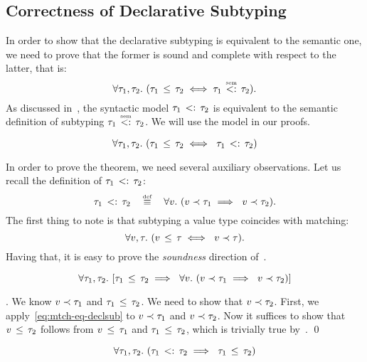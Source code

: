 \subsection{Correctness of Declarative Subtyping}\label{sec:declsub-correct}

In order to show that the declarative subtyping is equivalent
to the semantic one,
we need to prove that the former is sound and complete with respect
to the latter, that is:
\[
\forall \ty_1, \ty_2.\ (\bjsub{\ty_1}{\ty_2} \iff \bjtruesemsub{\ty_1}{\ty_2}).
\]
As discussed in~, 
the syntactic model $\tau_1 \, <: \, \tau_2$ is equivalent 
to the semantic definition of subtyping $\bjtruesemsub{\ty_1}{\ty_2}$.
We will use the model in our proofs.

\begin{theorem}\label{thm:declsub-correct}
\[
\forall \ty_1, \ty_2.\ (\bjsub{\ty_1}{\ty_2} \iff\ \bjsemsub{\ty_1}{\ty_2})
\]
\end{theorem}

In order to prove the theorem, we need several auxiliary observations.
Let us recall the definition of $\tau_1 \, <: \, \tau_2$:
\[
\bjsemsub{\ty_1}{\ty_2} \quad \defsign \quad
\forall \vty.\ (\bjmtch{\vty}{\ty_1} \implies\ \bjmtch{\vty}{\ty_2}).
\]
The first thing to note is that
subtyping a value type coincides with matching:
\begin{equation}\label{eq:mtch-eq-declsub}
\forall \vty, \ty.\ (\bjsub{\vty}{\ty} \iff\ \bjmtch{\vty}{\ty}).
\end{equation}
Having that, it is easy to prove the \emph{soundness} direction
of~.
\begin{lemma}
\[
\forall \ty_1, \ty_2.\ 
[\bjsub{\ty_1}{\ty_2} \implies\ 
\forall \vty.\ (\bjmtch{\vty}{\ty_1} \implies\ \bjmtch{\vty}{\ty_2})]
\]
\end{lemma}
\noindent
\Proof. We know $v \prec \tau_1$ and $\tau_1 \, \leq \, \tau_2$.
We need to show that $v \prec \tau_2$.
First, we apply~\eqref{eq:mtch-eq-declsub} to $v \prec \tau_1$
and $v \prec \tau_2$. 
Now it suffices to show that $v \, \leq \, \tau_2$ follows from
$v \, \leq \, \tau_1$ and $\tau_1 \, \leq \, \tau_2$, 
which is trivially true by~\RD{Trans}.
\qed

\begin{lemma}\label{lem:declsub-complete}
\[	
\forall \ty_1, \ty_2.\ 
(\bjsemsub{\ty_1}{\ty_2} \implies\ \bjsub{\ty_1}{\ty_2})
\]
\end{lemma}

